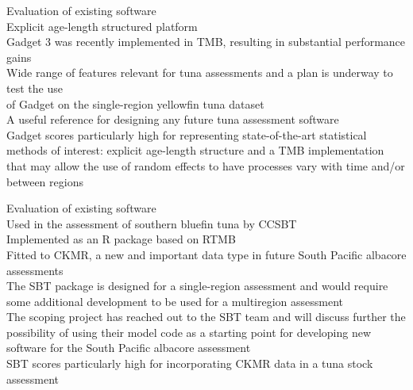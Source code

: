 \documentclass[aspectratio=169,fleqn]{beamer}
\begin{document}

\begin{frame}{Evaluation of existing software}\small
  \\[2ex]
  Explicit age-length structured platform\\[2.5ex]
  Gadget 3 was recently implemented in TMB, resulting in substantial performance
  gains\\[2.5ex]
  Wide range of features relevant for tuna assessments and a plan
  is underway to test the use\\
  of Gadget on the single-region yellowfin tuna dataset\\[2.5ex]
  A useful reference for designing any future tuna assessment software\\[2.5ex]
  Gadget scores particularly high for representing state-of-the-art statistical
  methods of interest: explicit age-length structure and a TMB implementation
  that may allow the use of random effects to have processes vary with time
  and/or between regions\\[8ex]
\end{frame}


\begin{frame}{Evaluation of existing software}\small
  \\[2ex]
  Used in the assessment of southern bluefin tuna by CCSBT\\[2.5ex]
  Implemented as an R package based on RTMB\\[2.5ex]
  Fitted to CKMR, a new and important data type in future South Pacific albacore
  assessments\\[2.5ex]
  The SBT package is designed for a single-region assessment and would require
  some additional development to be used for a multiregion assessment\\[2.5ex]
  The scoping project has reached out to the SBT team and will discuss further
  the possibility of using their model code as a starting point for developing
  new software for the South Pacific albacore assessment\\[2.5ex]
  SBT scores particularly high for incorporating CKMR data in a tuna stock
  assessment\\[2ex]
\end{frame}
\end{document}
